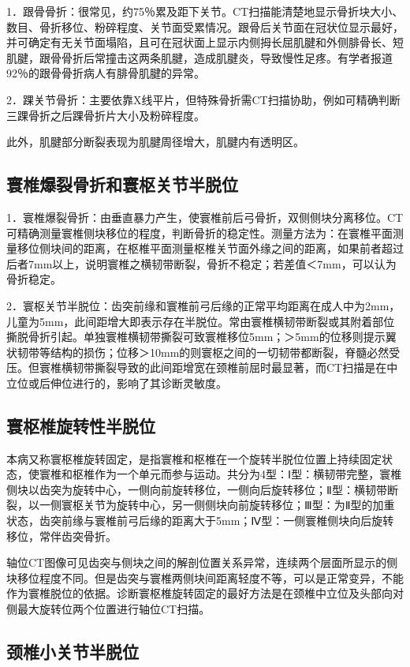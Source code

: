 1．跟骨骨折：很常见，约75％累及距下关节。CT扫描能清楚地显示骨折块大小、数目、骨折移位、粉碎程度、关节面受累情况。跟骨后关节面在冠状位显示最好，并可确定有无关节面塌陷，且可在冠状面上显示内侧拇长屈肌腱和外侧腓骨长、短肌腱，跟骨骨折后常撞击这两条肌腱，造成肌腱炎，导致慢性足疼。有学者报道92％的跟骨骨折病人有腓骨肌腱的异常。

2．踝关节骨折：主要依靠X线平片，但特殊骨折需CT扫描协助，例如可精确判断三踝骨折之后踝骨折片大小及粉碎程度。

此外，肌腱部分断裂表现为肌腱周径增大，肌腱内有透明区。

\subsection{寰椎爆裂骨折和寰枢关节半脱位}

1．寰椎爆裂骨折：由垂直暴力产生，使寰椎前后弓骨折，双侧侧块分离移位。CT可精确测量寰椎侧块移位的程度，判断骨折的稳定性。测量方法为：在寰椎平面测量移位侧块间的距离，在枢椎平面测量枢椎关节面外缘之间的距离，如果前者超过后者7mm以上，说明寰椎之横韧带断裂，骨折不稳定；若差值＜7mm，可以认为骨折稳定。

2．寰枢关节半脱位：齿突前缘和寰椎前弓后缘的正常平均距离在成人中为2mm，儿童为5mm，此间距增大即表示存在半脱位。常由寰椎横韧带断裂或其附着部位撕脱骨折引起。单独寰椎横韧带撕裂可致寰椎移位5mm；＞5mm的位移则提示翼状韧带等结构的损伤；位移＞10mm的则寰枢之间的一切韧带都断裂，脊髓必然受压。但寰椎横韧带撕裂导致的此间距增宽在颈椎前屈时最显著，而CT扫描是在中立位或后伸位进行的，影响了其诊断灵敏度。

\subsection{寰枢椎旋转性半脱位}

本病又称寰枢椎旋转固定，是指寰椎和枢椎在一个旋转半脱位位置上持续固定状态，使寰椎和枢椎作为一个单元而参与运动。共分为4型：Ⅰ型：横韧带完整，寰椎侧块以齿突为旋转中心，一侧向前旋转移位，一侧向后旋转移位；Ⅱ型：横韧带断裂，以一侧寰枢关节为旋转中心，另一侧侧块向前旋转移位；Ⅲ型：为Ⅱ型的加重状态，齿突前缘与寰椎前弓后缘的距离大于5mm；Ⅳ型：一侧寰椎侧块向后旋转移位，常伴齿突骨折。

轴位CT图像可见齿突与侧块之间的解剖位置关系异常，连续两个层面所显示的侧块移位程度不同。但是齿突与寰椎两侧块间距离轻度不等，可以是正常变异，不能作为寰椎脱位的依据。诊断寰枢椎旋转固定的最好方法是在颈椎中立位及头部向对侧最大旋转位两个位置进行轴位CT扫描。

\subsection{颈椎小关节半脱位}


